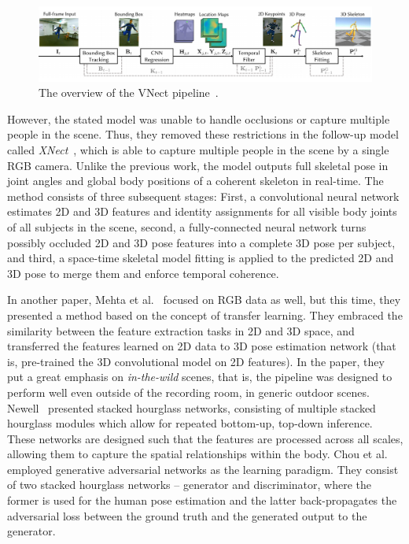 \vspace{5mm}
\begin{figure}[H]
\begin{center}
  \includegraphics[width=\textwidth]{images/related_work/VNect.PNG}
  \caption{The overview of the VNect pipeline~\cite{VNect_SIGGRAPH2017}.}
  \label{fig:Vnect}
\end{center}
\end{figure}

\noindent However, the stated model was unable to handle occlusions or capture multiple people in the scene. Thus, they removed these restrictions in the follow-up model called \textit{XNect}~\cite{DBLP:journals/corr/abs-1907-00837}, which is able to capture multiple people in the scene by a single RGB camera. Unlike the previous work, the model outputs full skeletal pose in joint angles and global body positions of a coherent skeleton in real-time. The method consists of three subsequent stages: First, a convolutional neural network estimates 2D and 3D features and identity assignments for all visible body joints of all subjects in the scene, second, a fully-connected neural network turns possibly occluded 2D and 3D pose features into a complete 3D pose per subject, and third, a space-time skeletal model fitting is applied to the predicted 2D and 3D pose to merge them and enforce temporal coherence.\par
\vspace{5mm}
\noindent
In another paper, Mehta et al.~\cite{mono-3dhp2017} focused on RGB data as well, but this time, they presented a method based on the concept of transfer learning. They embraced the similarity between the feature extraction tasks in 2D and 3D space, and transferred the features learned on 2D data to 3D pose estimation network (that is, pre-trained the 3D convolutional model on 2D features). In the paper, they put a great emphasis on \textit{in-the-wild} scenes, that is, the pipeline was designed to perform well even outside of the recording room, in generic outdoor scenes. Newell~\cite{DBLP:journals/corr/NewellYD16} presented stacked hourglass networks, consisting of multiple stacked hourglass modules which allow for repeated bottom-up, top-down inference. These networks are designed such that the features are processed across all scales, allowing them to capture the spatial relationships within the body. Chou et al.~\cite{DBLP:journals/corr/ChouCC17} employed generative adversarial networks as the learning paradigm. They consist of two stacked hourglass networks – generator and discriminator, where the former is used for the human pose estimation and the latter back-propagates the adversarial loss between the ground truth and the generated output to the generator. \par
